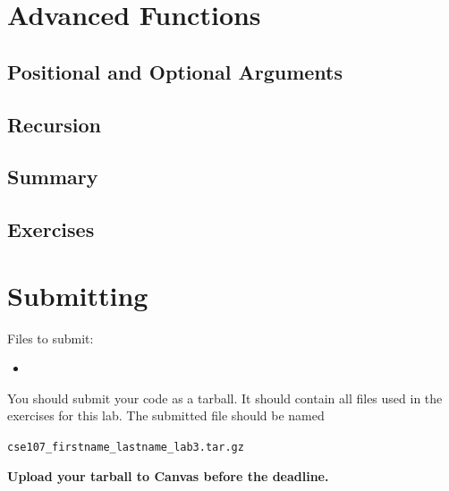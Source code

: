 \documentclass[11pt]{cselabheader}
\begin{document}
\pagebreak
\section{Advanced Functions}
\label{sec:adv}

\subsection{Positional and Optional Arguments}
\label{subsec:adv.args}

\subsection{Recursion}
\label{subsec:adv.recursion}

\subsection{Summary}
\label{subsec:adv.sum}

\subsection{Exercises}
\label{subsec:adv.ex}

\pagebreak
\section{Submitting}

Files to submit:
\begin{itemize}
  \item 
\end{itemize}

You should submit your code as a tarball. It should contain all files
used in the exercises for this lab. The submitted file should be named
\begin{center}
  \texttt{cse107\_firstname\_lastname\_lab3.tar.gz}
\end{center}

\begin{center}
  \textbf{Upload your tarball to Canvas before the deadline.}
\end{center}
\end{document}
